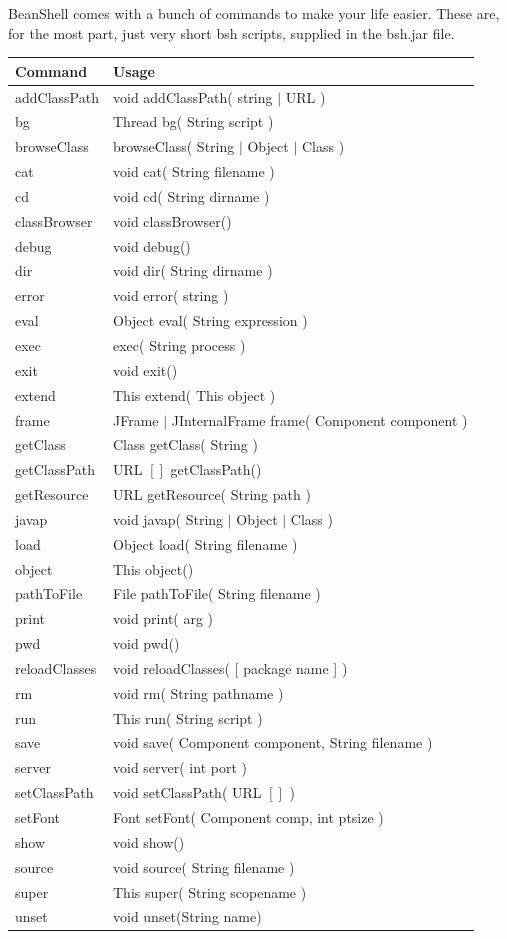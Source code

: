 \documentclass[twoside,11pt]{article}
\renewcommand{\_}{\texttt{\symbol{95}}}
\begin{document}
BeanShell comes with a bunch of commands to make your life easier.
These are, for the most part, just very short bsh scripts, supplied in the
bsh.jar file.

\begin{tabular}{|l|l|}
\hline
Command       & Usage \\
\hline
addClassPath  & void addClassPath( string $|$ URL )\\
bg            & Thread bg( String script )\\
browseClass   & browseClass( String $|$ Object $|$ Class )\\
cat           & void cat( String filename )\\
cd            & void cd( String dirname )\\
classBrowser  & void classBrowser()\\
debug         & void debug()\\
dir           & void dir( String dirname )\\
error         & void error( string )\\
eval          & Object eval( String expression )\\
exec          & exec( String process )\\
exit          & void exit()\\
extend        & This extend( This object )\\
frame         & JFrame $|$ JInternalFrame frame( Component component )\\
getClass      & Class getClass( String )\\
getClassPath  & URL $[]$ getClassPath()\\
getResource   & URL getResource( String path )\\
javap         & void javap( String $|$ Object $|$ Class )\\
load          & Object load( String filename )\\
object        & This object()\\
pathToFile    & File pathToFile( String filename )\\
print         & void print( arg )\\
pwd           & void pwd()\\
reloadClasses & void reloadClasses( [ package name ] )\\
rm            & void rm( String pathname )\\
run           & This run( String script )\\
save          & void save( Component component, String filename )\\
server        & void server( int port )\\
setClassPath  & void setClassPath( URL $[]$ )\\
setFont       & Font setFont( Component comp, int ptsize )\\
show          & void show()\\
source        & void source( String filename )\\
super         & This super( String scopename )\\
unset         & void unset(String name)\\
\hline
\end{tabular}
\end{document}
